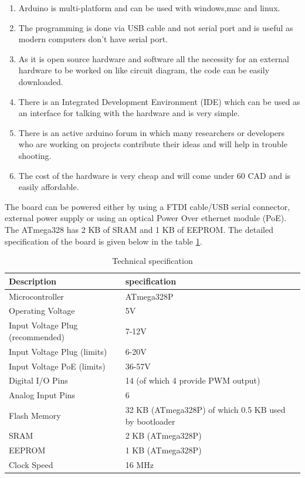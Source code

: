 \begin{enumerate}


  \item Arduino is multi-platform and can be used with windows,mac and linux.

  \item The programming is done via USB cable and not serial port and is useful as modern computers don't have serial port.

  \item As it is open source hardware and software all the necessity for an external hardware to be worked on like circuit diagram, the code can be easily downloaded.
  
  \item There is an Integrated Development Environment (IDE) which can be used as an interface for talking with the hardware and is very simple.
  
  \item There is an active arduino forum in which many researchers or developers who are working on projects contribute their ideas and will help in trouble shooting.
  
  \item The cost of the hardware is very cheap and will come under 60 CAD and is easily affordable.
  
\end{enumerate}

The board can be powered either by using a FTDI cable/USB serial connector, external power supply or using an optical Power Over ethernet module (PoE). The ATmega328 has 2 KB of SRAM and 1 KB of EEPROM. The detailed specification\cite{Guti2017} of the board is given below in the table \ref{table:Technical specification}.
 
\begin{table}[h]
  
  
  \begin{tabularx}{\columnwidth}{X|X}
      \hline
      Description                 & specification    \\
      \hline
      Microcontroller & ATmega328P \\
      Operating Voltage & 5V\\
      Input Voltage Plug (recommended) & 7-12V\\
      Input Voltage Plug (limits)       & 6-20V\\
      Input Voltage PoE (limits)        & 36-57V \\
      Digital I/O Pins    & 14 (of which 4 provide PWM output)     \\
      Analog Input Pins & 6\\
      Flash Memory & 32 KB (ATmega328P) of which 0.5 KB used by bootloader\\
      SRAM     & 2 KB (ATmega328P)\\
      EEPROM   & 1 KB (ATmega328P) \\
      Clock Speed  & 16 MHz\\
      \hline
    
  \end{tabularx}
  \caption{Technical specification}
  \label{table:Technical specification}
\end{table}
 

